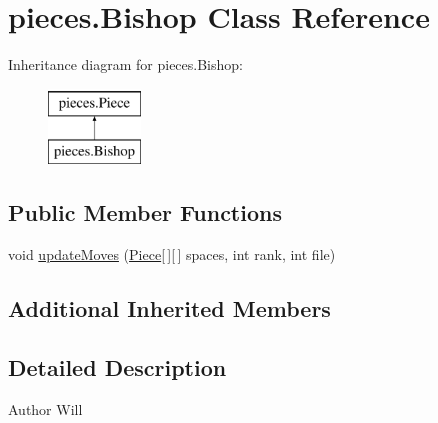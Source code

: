\hypertarget{classpieces_1_1_bishop}{\section{pieces.\-Bishop Class Reference}
\label{classpieces_1_1_bishop}
}
Inheritance diagram for pieces.\-Bishop\-:\begin{figure}[H]
\begin{center}
\leavevmode
\includegraphics[height=2.000000cm]{classpieces_1_1_bishop}
\end{center}
\end{figure}
\subsection*{Public Member Functions}
\begin{DoxyCompactItemize}
\item 
void \hyperlink{classpieces_1_1_bishop_a81c18cc08e2ff3629418a961ae63fa72}{update\-Moves} (\hyperlink{classpieces_1_1_piece}{Piece}\mbox{[}$\,$\mbox{]}\mbox{[}$\,$\mbox{]} spaces, int rank, int file)
\end{DoxyCompactItemize}
\subsection*{Additional Inherited Members}


\subsection{Detailed Description}
\begin{DoxyAuthor}{Author}
Will 
\end{DoxyAuthor}


